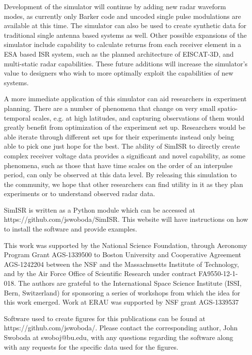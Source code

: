 \documentclass[draft,ras]{agutex}
\begin{document}
\begin{article}
Development of the simulator will continue by adding new radar waveform modes, as currently only Barker code and uncoded single pulse modulations are available at this time. The simulator can also be used to create synthetic data for traditional single antenna based systems as well. Other possible expansions of the simulator include capability to calculate returns from each receiver element in a ESA based ISR system, such as the planned architecture of EISCAT-3D, and multi-static radar capabilities. These future additions will increase the simulator's value to designers who wish to more optimally exploit the capabilities of new systems. 

A more immediate application of this simulator can aid researchers in experiment planning. There are a number of phenomena that change on very small spatio-temporal scales, e.g. at high latitudes, and capturing observations of them would greatly benefit from optimization of the experiment set up. Researchers would be able iterate through different set ups for their experiments instead only being able to pick one just hope for the best. The ability of SimISR to directly create complex receiver voltage data provides a significant and novel capability, as some phenomena, such as those that have time scales on the order of an interpulse period, can only be observed at this data level. By releasing this simulation to the community, we hope that other researchers can find utility in it as they plan experiments or to understand observed radar data. 

SimISR is written as a Python module which can be accessed at https://github.com/jswoboda/SimISR. This website will have instructions on how to install the software and provide examples.
\begin{acknowledgments}
This work was supported by the National Science Foundation, through Aeronomy Program Grant AGS-1339500 to Boston University and Cooperative Agreement AGS-1242204 between the NSF and the Massachusetts Institute of Technology, and by the Air Force Office of Scientific Research under contract FA9550-12-1-018.   The authors are grateful to the International Space Science Institute (ISSI, Bern, Switzerland) for sponsoring a series of workshops from which the idea for this work emerged. Work at ERAU was supported by NSF grant AGS-1339537

Software used to create figures for this publications can be found at https://github.com/jswoboda/. Please contact the corresponding author, John Swoboda at swoboj@bu.edu, with any questions regarding the software along with any requests for the specific data used for the figures. \end{acknowledgments}




\end{article}
\end{document}
